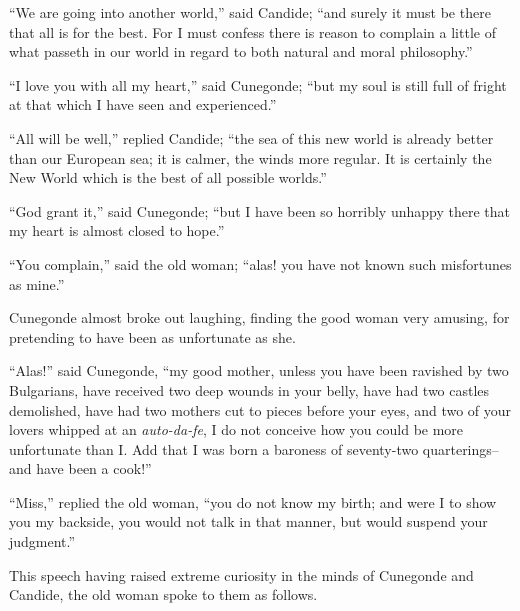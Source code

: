 ``We are going into another world,'' said Candide; ``and surely it must be there that all is for the best. For I must confess there is reason to complain a little of what passeth in our world in regard to both natural and moral philosophy.''

``I love you with all my heart,'' said Cunegonde; ``but my soul is still full of fright at that which I have seen and experienced.''

``All will be well,'' replied Candide; ``the sea of this new world is already better than our European sea; it is calmer, the winds more regular. It is certainly the New World which is the best of all possible worlds.''

``God grant it,'' said Cunegonde; ``but I have been so horribly unhappy there that my heart is almost closed to hope.''

``You complain,'' said the old woman; ``alas! you have not known such misfortunes as mine.''

Cunegonde almost broke out laughing, finding the good woman very amusing, for pretending to have been as unfortunate as she.

``Alas!'' said Cunegonde, ``my good mother, unless you have been ravished by two Bulgarians, have received two deep wounds in your belly, have had two castles demolished, have had two mothers cut to pieces before your eyes, and two of your lovers whipped at an \textit{auto-da-fe}, I do not conceive how you could be more unfortunate than I. Add that I was born a baroness of seventy-two quarterings--and have been a cook!''

``Miss,'' replied the old woman, ``you do not know my birth; and were I to show you my backside, you would not talk in that manner, but would suspend your judgment.''

This speech having raised extreme curiosity in the minds of Cunegonde and Candide, the old woman spoke to them as follows.


